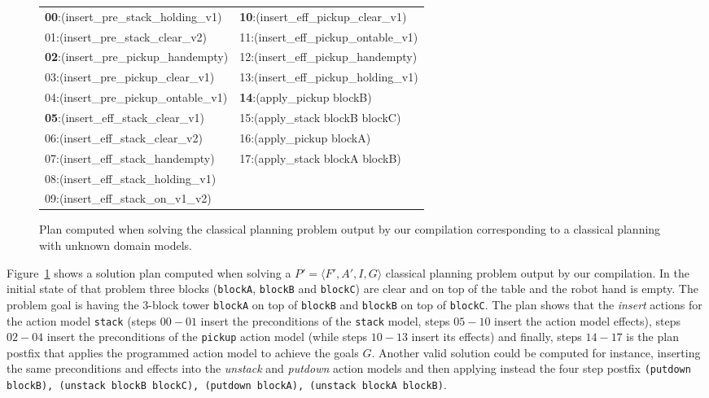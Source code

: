 \documentclass{article}
\newcommand{\tup}[1]{{\langle #1 \rangle}}
\begin{document}
\begin{figure}[hbt!]
	{\tiny\tt

\begin{tabular}{ll}
		{\bf 00}:(insert\_pre\_stack\_holding\_v1) & {\bf 10}:(insert\_eff\_pickup\_clear\_v1) \\
		01:(insert\_pre\_stack\_clear\_v2) & 11:(insert\_eff\_pickup\_ontable\_v1)\\
                {\bf 02}:(insert\_pre\_pickup\_handempty) & 12:(insert\_eff\_pickup\_handempty)\\
                03:(insert\_pre\_pickup\_clear\_v1) & 13:(insert\_eff\_pickup\_holding\_v1)\\
                04:(insert\_pre\_pickup\_ontable\_v1) & {\bf 14}:(apply\_pickup blockB)\\
                {\bf 05}:(insert\_eff\_stack\_clear\_v1) & 15:(apply\_stack blockB blockC)\\
                06:(insert\_eff\_stack\_clear\_v2) & 16:(apply\_pickup blockA)\\
                07:(insert\_eff\_stack\_handempty) & 17:(apply\_stack blockA blockB) \\
                08:(insert\_eff\_stack\_holding\_v1) & \\
                09:(insert\_eff\_stack\_on\_v1\_v2) &             		 
\end{tabular}
}
	\caption{\small Plan computed when solving the classical planning problem output by our compilation corresponding to a classical planning with unknown domain models.}
	\label{fig:plan-lplan}
\end{figure}

Figure~\ref{fig:plan-lplan} shows a solution plan computed when solving a $P'=\tup{F',A',I,G}$ classical planning problem output by our compilation. In the initial state of that problem three  blocks ({\small\tt blockA}, {\small\tt blockB} and {\small\tt blockC}) are clear and on top of the table and the robot hand is empty. The problem goal is having the 3-block tower {\tt blockA} on top of {\tt blockB} and {\tt blockB} on top of {\tt blockC}. The plan shows that the {\em insert} actions for the action model {\tt\small stack} (steps $00-01$ insert the preconditions of the {\tt\small stack} model, steps $05-10$ insert the action model effects), steps $02-04$ insert the preconditions of the {\tt\small pickup} action model (while steps $10-13$ insert its effects) and finally, steps $14-17$ is the plan postfix that applies the programmed action model to achieve the goals $G$. Another valid solution could be computed for instance, inserting the same preconditions and effects into the {\em unstack} and {\em putdown} action models and then applying instead the four step postfix {\tt\small (putdown blockB), (unstack blockB blockC), (putdown blockA), (unstack blockA blockB)}.
\end{document}

